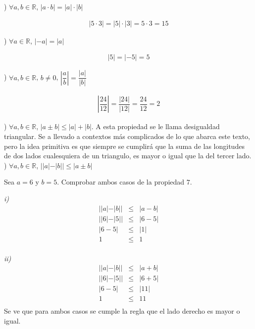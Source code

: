 )  $\forall a,b\in\mathbb{R}$, $|a\cdot b|=|a|\cdot|b|$  \\
\begin{myexample}
\begin{eqnarray*}
|5\cdot 3|=|5|\cdot |3|= 5\cdot 3= 15
\end{eqnarray*}
\end{myexample}
) $\forall a\in\mathbb{R}$, $|-a|=|a|$ \\
\begin{myexample}
\begin{eqnarray*}
|5|=|-5|=5
\end{eqnarray*}
\end{myexample}
) $\forall a,b\in\mathbb{R}$, $b\neq 0$, $\left|\dfrac{a}{b}\right|=\dfrac{|a|}{|b|}$ \\
\begin{myexample}
\begin{eqnarray*}
\left|\dfrac{24}{12}\right|=\dfrac{|24|}{|12|}=\dfrac{24}{12}=2
\end{eqnarray*}
\end{myexample}
) $\forall a,b\in\mathbb{R}$, $|a \pm b|\leq |a|+|b|$. A esta propiedad se le llama desigualdad triangular. Se a llevado a contextos más complicados de lo que abarca este texto, pero la idea primitiva es que siempre se cumplirá que la suma de las longitudes de dos lados cualesquiera de un triangulo, es mayor o igual que la del tercer lado. \\

) $\forall a,b\in\mathbb{R}$, $||a|-|b||\leq |a\pm b|$ \\

\begin{myexample}
Sea $a=6$ y $b=5$.  Comprobar ambos casos de la propiedad $7$. 
\end{myexample}
\noindent\textit{i)}
\begin{eqnarray*}
||a|-|b||&\leq & |a- b| \\
||6|-|5||&\leq & |6- 5| \\
|6-5|&\leq & |1|\\
1&\leq & 1\\
\end{eqnarray*}

\noindent\textit{ii)}
\begin{eqnarray*}
||a|-|b||&\leq & |a+ b| \\
||6|-|5||&\leq & |6+ 5| \\
|6-5|&\leq & |11|\\
1&\leq & 11\\
\end{eqnarray*}
Se ve que para ambos casos se cumple la regla que el lado derecho es mayor o igual.\\

